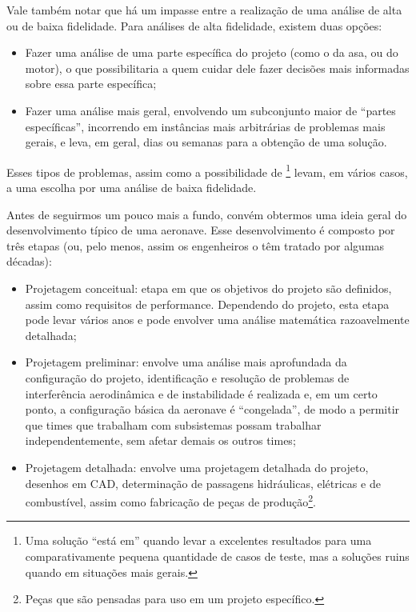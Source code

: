 \documentclass{article}
\begin{document}
Vale também notar que há um impasse entre a realização de uma análise
de alta ou de baixa fidelidade. Para análises de alta fidelidade,
existem duas opções:

\begin{itemize}
\item Fazer uma análise de uma parte específica do projeto (como o da
  asa, ou do motor), o que possibilitaria a quem cuidar dele fazer
  decisões mais informadas sobre essa parte específica;
\item Fazer uma análise mais geral, envolvendo um subconjunto maior de
  ``partes específicas'', incorrendo em instâncias mais arbitrárias de
  problemas mais gerais, e leva, em geral, dias ou semanas para a
  obtenção de uma solução.
\end{itemize}

Esses tipos de problemas, assim como a possibilidade de
 \footnote{Uma solução ``está em''
   quando levar a excelentes resultados para uma
  comparativamente pequena quantidade de casos de teste, mas a
  soluções ruins quando em situações mais gerais.} levam, em vários
casos, a uma escolha por uma análise de baixa fidelidade.


Antes de seguirmos um pouco mais a fundo, convém obtermos uma ideia
geral do desenvolvimento típico de uma aeronave. Esse desenvolvimento
é composto por três etapas\cite{hoburg} (ou, pelo menos, assim os
engenheiros o têm tratado por algumas décadas):
\begin{itemize}
\item Projetagem conceitual: etapa em que os objetivos do projeto são
  definidos, assim como requisitos de performance. Dependendo do
  projeto, esta etapa pode levar vários anos e pode envolver uma
  análise matemática razoavelmente detalhada;
\item Projetagem preliminar: envolve uma análise mais aprofundada da
  configuração do projeto, identificação e resolução de problemas de
  interferência aerodinâmica e de instabilidade é realizada e, em um
  certo ponto, a configuração básica da aeronave é ``congelada'', de
  modo a permitir que times que trabalham com subsistemas possam
  trabalhar independentemente, sem afetar demais os outros times;
\item Projetagem detalhada: envolve uma projetagem detalhada do
  projeto, desenhos em CAD, determinação de passagens hidráulicas,
  elétricas e de combustível, assim como fabricação de peças de
  produção\footnote{Peças que são pensadas para uso em um projeto
    específico.}.
\end{itemize}
\end{document}
